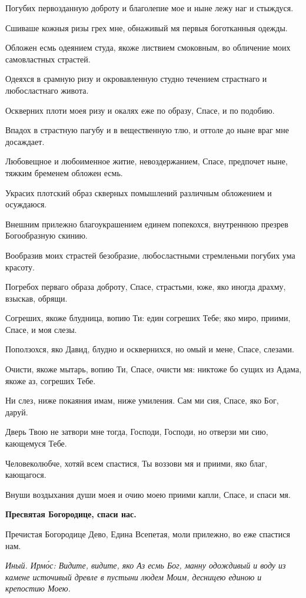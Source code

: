 Погубих первозданную доброту и благолепие мое и ныне лежу наг и стыждуся.

Сшиваше кожныя ризы грех мне, обнаживый мя первыя боготканныя одежды.

Обложен есмь одеянием студа, якоже листвием смоковным, во обличение моих самовластных страстей.

Одеяхся в срамную ризу и окровавленную студно течением страстнаго и любосластнаго живота.

Оскверних плоти моея ризу и окалях еже по образу, Спасе, и по подобию.

Впадох в страстную пагубу и в вещественную тлю, и оттоле до ныне враг мне досаждает.

Любовещное и любоименное житие, невоздержанием, Спасе, предпочет ныне, тяжким бременем обложен есмь.

Украсих плотский образ скверных помышлений различным обложением и осуждаюся.

Внешним прилежно благоукрашением единем попекохся, внутреннюю презрев Богообразную скинию.

Вообразив моих страстей безобразие, любосластными стремленьми погубих ума красоту.

Погребох перваго образа доброту, Спасе, страстьми, юже, яко иногда драхму, взыскав, обрящи.

Согреших, якоже блудница, вопию Ти: един согреших Тебе; яко миро, приими, Спасе, и моя слезы.

Поползохся, яко Давид, блудно и осквернихся, но омый и мене, Спасе, слезами.

Очисти, якоже мытарь, вопию Ти, Спасе, очисти мя: никтоже бо сущих из Адама, якоже аз, согреших Тебе.

Ни слез, ниже покаяния имам, ниже умиления. Сам ми сия, Спасе, яко Бог, даруй.

Дверь Твою не затвори мне тогда, Господи, Господи, но отверзи ми сию, кающемуся Тебе.

Человеколюбче, хотяй всем спастися, Ты воззови мя и приими, яко благ, кающагося.

Внуши воздыхания души моея и очию моею приими капли, Спасе, и спаси мя.

\bfseries Пресвятая Богородице, спаси нас.

\normalfont{}

Пречистая Богородице Дево, Едина Всепетая, моли прилежно, во еже спастися нам.

\itshape Иный. Ирм\'{о}с\normalfont{}: Видите, видите, яко Аз есмь Бог, манну одождивый и воду из камене источивый древле в пустыни людем Моим, десницею единою и крепостию Моею.

